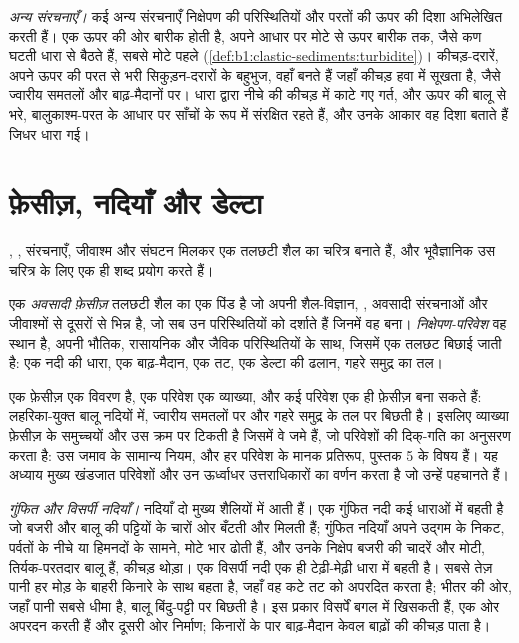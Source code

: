 \emph{अन्य संरचनाएँ।} कई अन्य संरचनाएँ निक्षेपण की परिस्थितियों और परतों की ऊपर की दिशा अभिलेखित करती हैं। एक  ऊपर की ओर बारीक होती है, अपने आधार पर मोटे से ऊपर बारीक तक, जैसे कण घटती धारा से बैठते हैं, सबसे मोटे पहले (\cref{def:b1:clastic-sediments:turbidite})। कीचड़-दरारें, अपने ऊपर की परत से भरी सिकुड़न-दरारों के बहुभुज, वहाँ बनते हैं जहाँ कीचड़ हवा में सूखता है, जैसे ज्वारीय समतलों और बाढ़-मैदानों पर। धारा द्वारा नीचे की कीचड़ में काटे गए गर्त, और ऊपर की बालू से भरे, बालुकाश्म-परत के आधार पर साँचों के रूप में संरक्षित रहते हैं, और उनके आकार वह दिशा बताते हैं जिधर धारा गई।

\section{फ़ेसीज़, नदियाँ और डेल्टा}\label{sec:b1:clastic-sediments:rivers-deltas}

, , संरचनाएँ, जीवाश्म और संघटन मिलकर एक तलछटी शैल का चरित्र बनाते हैं, और भूवैज्ञानिक उस चरित्र के लिए एक ही शब्द प्रयोग करते हैं।

\begin{definition}[अवसादी फ़ेसीज़, निक्षेपण-परिवेश]\label{def:b1:clastic-sediments:facies}
एक \emph{अवसादी फ़ेसीज़} तलछटी शैल का एक पिंड है जो अपनी शैल-विज्ञान, , अवसादी संरचनाओं और जीवाश्मों से दूसरों से भिन्न है, जो सब उन परिस्थितियों को दर्शाते हैं जिनमें वह बना। \emph{निक्षेपण-परिवेश} वह स्थान है, अपनी भौतिक, रासायनिक और जैविक परिस्थितियों के साथ, जिसमें एक तलछट बिछाई जाती है: एक नदी की धारा, एक बाढ़-मैदान, एक तट, एक डेल्टा की ढलान, गहरे समुद्र का तल।
\end{definition}

एक फ़ेसीज़ एक विवरण है, एक परिवेश एक व्याख्या, और कई परिवेश एक ही फ़ेसीज़ बना सकते हैं: लहरिका-युक्त बालू नदियों में, ज्वारीय समतलों पर और गहरे समुद्र के तल पर बिछती है। इसलिए व्याख्या फ़ेसीज़ के समुच्चयों और उस क्रम पर टिकती है जिसमें वे जमे हैं, जो परिवेशों की दिक्-गति का अनुसरण करता है: उस जमाव के सामान्य नियम, और हर परिवेश के मानक प्रतिरूप, पुस्तक 5 के विषय हैं। यह अध्याय मुख्य खंडजात परिवेशों और उन ऊर्ध्वाधर उत्तराधिकारों का वर्णन करता है जो उन्हें पहचानते हैं।

\emph{गुंफित और विसर्पी नदियाँ।} नदियाँ दो मुख्य शैलियों में आती हैं। एक गुंफित नदी कई धाराओं में बहती है जो बजरी और बालू की पट्टियों के चारों ओर बँटती और मिलती हैं; गुंफित नदियाँ अपने उद्गम के निकट, पर्वतों के नीचे या हिमनदों के सामने, मोटे भार ढोती हैं, और उनके निक्षेप बजरी की चादरें और मोटी, तिर्यक-परतदार बालू हैं, कीचड़ थोड़ा। एक विसर्पी नदी एक ही टेढ़ी-मेढ़ी धारा में बहती है। सबसे तेज़ पानी हर मोड़ के बाहरी किनारे के साथ बहता है, जहाँ वह कटे तट को अपरदित करता है; भीतर की ओर, जहाँ पानी सबसे धीमा है, बालू बिंदु-पट्टी पर बिछती है। इस प्रकार विसर्पें बगल में खिसकती हैं, एक ओर अपरदन करती हैं और दूसरी ओर निर्माण; किनारों के पार बाढ़-मैदान केवल बाढ़ों की कीचड़ पाता है।


